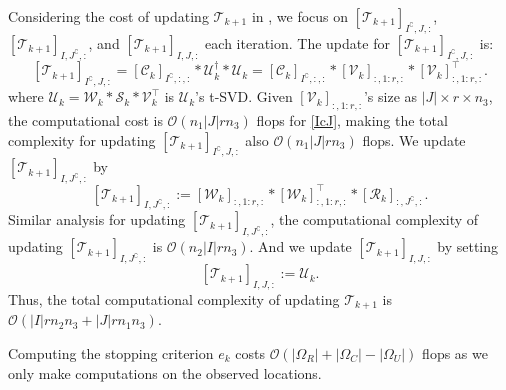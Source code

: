 \documentclass[twoside,12pt]{article}
\def\S{\mathcal{S}}
\def\S{\mathcal{S}}
\begin{document}
Considering the cost of updating $\mathcal{T}_{k+1}$ in , we focus on $[\mathcal{T}_{k+1}]_{I^{\complement},J,:}$, $[\mathcal{T}_{k+1}]_{I,J^{\complement},:}$, and $[\mathcal{T}_{k+1}]_{I,J,:}$ each iteration. The update for $[\mathcal{T}_{k+1}]_{I^{\complement}, J,:}$ is:
\begin{equation}\label{IcJ}
    [\mathcal{T}_{k+1}]_{I^{\complement}, J,:} = [\mathcal{C}_k]_{I^{\complement},:,:}*\mathcal{U}_k^{\dagger}*\mathcal{U}_k  = [\mathcal{C}_k]_{I^{\complement},:,:}*[\mathcal{V}_{k}]_{:,1:r,:}*[\mathcal{V}_{k}]_{:,1:r,:}^{\top}.
\end{equation}
where $\mathcal{U}_k=\mathcal{W}_k*\S_k*\mathcal{V}_{k}^\top$ is $\mathcal{U}_k$'s t-SVD. 
Given $[\mathcal{V}_{k}]_{:,1:r,:}$'s size as $|J|\times r \times n_3$, the computational cost is $\mathcal{O}(n_{1}|J|rn_{3})$ flops for \eqref{IcJ}, making the total complexity for updating $[\mathcal{T}_{k+1}]_{I^{\complement}, J,:}$ also $\mathcal{O}(n_{1}|J|rn_{3})$ flops.  {We update $[\mathcal{T}_{k+1}]_{I, J^{\complement},:}$ by \begin{equation}\label{IJc}
[\mathcal{T}_{k+1}]_{I, J^{\complement},:}:=[\mathcal{W}_{k}]_{:,1:r,:}*[\mathcal{W}_{k}]_{:,1:r,:}^{\top}*[\mathcal{R}_k]_{:, J^{\complement},:}.
\end{equation}} 
Similar analysis for   updating $[\mathcal{T}_{k+1}]_{I,J^{\complement},:}$, the computational complexity  of updating $[\mathcal{T}_{k+1}]_{I,J^{\complement},:}$ is $\mathcal{O}(n_{2}|I|rn_{3})$. And we update 
$[\mathcal{T}_{k+1}]_{I, J,:}$ by setting 
\begin{equation}\label{IJ}
[\mathcal{T}_{k+1}]_{I, J,:}:= \mathcal{U}_k.
\end{equation}  Thus, the total computational complexity of updating $\mathcal{T}_{k+1}$ is $\mathcal{O}(|I|rn_{2}n_{3}+|J|rn_{1}n_{3})$. 

Computing the stopping criterion $e_k$ costs $\mathcal{O}\left(|\Omega_{R}|+|\Omega_{C}|-|\Omega_{U}|\right)$ flops
as we only make computations on the observed locations. 
\end{document}
